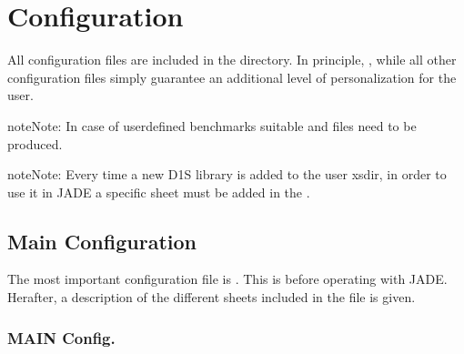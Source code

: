 \documentclass[letterpaper,10pt,english]{sphinxmanual}
\let\sphinxpxdimen\pdfpxdimen\else\newdimen\sphinxpxdimen
\begin{document}
\chapter{Configuration}
\label{\detokenize{usage/configuration:configuration}}\label{\detokenize{usage/configuration:config}}\label{\detokenize{usage/configuration::doc}}
All configuration files are included in the  directory.
In principle,  {\hyperref[\detokenize{usage/configuration:mainconfig}]{}} , while
all other configuration files simply guarantee an additional level of personalization for the user.

\begin{sphinxadmonition}{note}{Note:}
In case of user\sphinxhyphen{}defined benchmarks suitable {\hyperref[\detokenize{usage/configuration:runconf}]{}} and {\hyperref[\detokenize{usage/configuration:ppconf}]{}} files need
to be produced.
\end{sphinxadmonition}

\begin{sphinxadmonition}{note}{Note:}
Every time a new D1S library is added to the user xsdir, in order to use it in JADE a specific
sheet must be added in the {\hyperref[\detokenize{usage/configuration:activationfile}]{}}.
\end{sphinxadmonition}


\section{Main Configuration}
\label{\detokenize{usage/configuration:main-configuration}}\label{\detokenize{usage/configuration:mainconfig}}
The most important configuration file is .
This is  before operating with JADE.
Herafter, a description of the different sheets included in the file is given.


\subsection{MAIN Config.}
\label{\detokenize{usage/configuration:main-config}}
\noindent\sphinxincludegraphics[width=600\sphinxpxdimen]{{main}.png}
\end{document}
